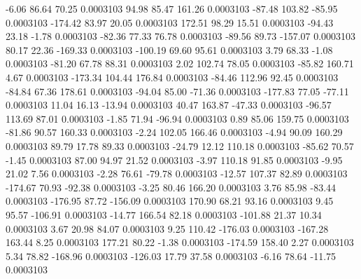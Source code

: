        -6.06       86.64       70.25     0.0003103
       94.98       85.47      161.26     0.0003103
      -87.48      103.82      -85.95     0.0003103
     -174.42       83.97       20.05     0.0003103
      172.51       98.29       15.51     0.0003103
      -94.43       23.18       -1.78     0.0003103
      -82.36       77.33       76.78     0.0003103
      -89.56       89.73     -157.07     0.0003103
       80.17       22.36     -169.33     0.0003103
     -100.19       69.60       95.61     0.0003103
        3.79       68.33       -1.08     0.0003103
      -81.20       67.78       88.31     0.0003103
        2.02      102.74       78.05     0.0003103
      -85.82      160.71        4.67     0.0003103
     -173.34      104.44      176.84     0.0003103
      -84.46      112.96       92.45     0.0003103
      -84.84       67.36      178.61     0.0003103
      -94.04       85.00      -71.36     0.0003103
     -177.83       77.05      -77.11     0.0003103
       11.04       16.13      -13.94     0.0003103
       40.47      163.87      -47.33     0.0003103
      -96.57      113.69       87.01     0.0003103
       -1.85       71.94      -96.94     0.0003103
        0.89       85.06      159.75     0.0003103
      -81.86       90.57      160.33     0.0003103
       -2.24      102.05      166.46     0.0003103
       -4.94       90.09      160.29     0.0003103
       89.79       17.78       89.33     0.0003103
      -24.79       12.12      110.18     0.0003103
      -85.62       70.57       -1.45     0.0003103
       87.00       94.97       21.52     0.0003103
       -3.97      110.18       91.85     0.0003103
       -9.95       21.02        7.56     0.0003103
       -2.28       76.61      -79.78     0.0003103
      -12.57      107.37       82.89     0.0003103
     -174.67       70.93      -92.38     0.0003103
       -3.25       80.46      166.20     0.0003103
        3.76       85.98      -83.44     0.0003103
     -176.95       87.72     -156.09     0.0003103
      170.90       68.21       93.16     0.0003103
        9.45       95.57     -106.91     0.0003103
      -14.77      166.54       82.18     0.0003103
     -101.88       21.37       10.34     0.0003103
        3.67       20.98       84.07     0.0003103
        9.25      110.42     -176.03     0.0003103
     -167.28      163.44        8.25     0.0003103
      177.21       80.22       -1.38     0.0003103
     -174.59      158.40        2.27     0.0003103
        5.34       78.82     -168.96     0.0003103
     -126.03       17.79       37.58     0.0003103
       -6.16       78.64      -11.75     0.0003103
